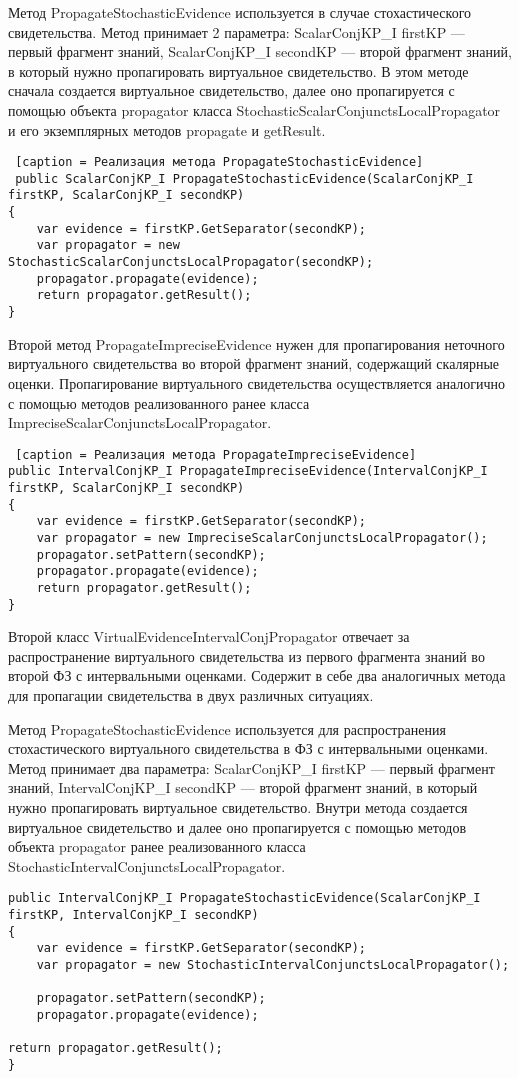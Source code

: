  Метод PropagateStochasticEvidence используется в случае стохастического свидетельства. Метод принимает 2 параметра: ScalarConjKP\_I firstKP --- первый фрагмент знаний, ScalarConjKP\_I secondKP --- второй фрагмент знаний, в который нужно пропагировать виртуальное свидетельство. В этом методе сначала создается виртуальное свидетельство, далее оно пропагируется с помощью объекта propagator класса  StochasticScalarConjunctsLocalPropagator и его экземплярных методов propagate и getResult. 
 \begin{lstlisting} [caption = Реализация метода PropagateStochasticEvidence]
 public ScalarConjKP_I PropagateStochasticEvidence(ScalarConjKP_I firstKP, ScalarConjKP_I secondKP)
{
    var evidence = firstKP.GetSeparator(secondKP);
    var propagator = new StochasticScalarConjunctsLocalPropagator(secondKP);
    propagator.propagate(evidence);
    return propagator.getResult();
}\end{lstlisting}
 
Второй метод PropagateImpreciseEvidence нужен для пропагирования неточного виртуального свидетельства во второй фрагмент знаний, содержащий скалярные оценки. Пропагирование виртуального свидетельства осуществляется аналогично с помощью методов реализованного ранее класса ImpreciseScalarConjunctsLocalPropagator.
 \begin{lstlisting} [caption = Реализация метода PropagateImpreciseEvidence]
public IntervalConjKP_I PropagateImpreciseEvidence(IntervalConjKP_I firstKP, ScalarConjKP_I secondKP)
{
    var evidence = firstKP.GetSeparator(secondKP);
    var propagator = new ImpreciseScalarConjunctsLocalPropagator();
    propagator.setPattern(secondKP);
    propagator.propagate(evidence);
    return propagator.getResult();
}
\end{lstlisting}

 Второй класс VirtualEvidenceIntervalConjPropagator  отвечает за распространение виртуального  свидетельства из первого фрагмента знаний во второй ФЗ с интервальными оценками. Содержит в себе два аналогичных метода для пропагации свидетельства в двух различных ситуациях.
 
 Метод PropagateStochasticEvidence используется для распространения стохастического виртуального свидетельства в ФЗ с интервальными оценками. Метод принимает два параметра: ScalarConjKP\_I firstKP --- первый фрагмент знаний, IntervalConjKP\_I secondKP --- второй фрагмент знаний, в который нужно пропагировать виртуальное свидетельство.  Внутри метода создается виртуальное свидетельство и далее оно пропагируется с помощью методов объекта propagator ранее реализованного класса  StochasticIntervalConjunctsLocalPropagator.
\begin{lstlisting}[caption = Реализация метода PropagateStochasticEvidence]
public IntervalConjKP_I PropagateStochasticEvidence(ScalarConjKP_I firstKP, IntervalConjKP_I secondKP)
{
    var evidence = firstKP.GetSeparator(secondKP);
    var propagator = new StochasticIntervalConjunctsLocalPropagator();

    propagator.setPattern(secondKP);
    propagator.propagate(evidence);

return propagator.getResult();
}
\end{lstlisting}

